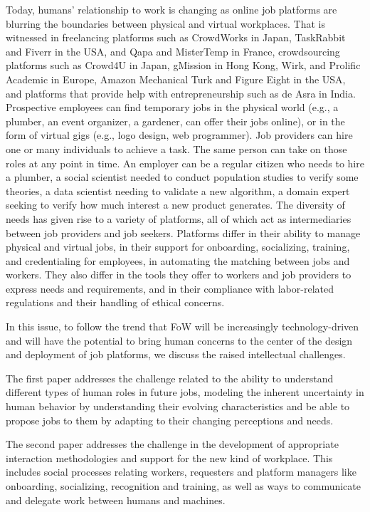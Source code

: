 \documentclass[11pt]{article}
\begin{document}
Today, humans' relationship to work is changing as online job platforms are blurring the boundaries between physical and virtual workplaces. That is witnessed in freelancing platforms such as CrowdWorks in Japan, TaskRabbit and Fiverr in the USA, and Qapa and MisterTemp in France, crowdsourcing platforms such as Crowd4U in Japan, gMission in Hong Kong, Wirk, and Prolific Academic in Europe, Amazon Mechanical Turk and Figure Eight in the USA, and platforms that provide help with entrepreneurship such as de Asra in India. Prospective employees can find temporary jobs in the physical world (e.g., a plumber, an event organizer, a gardener, can offer their jobs online), or in the form of virtual gigs (e.g., logo design, web programmer). Job providers can hire one or many individuals to achieve a task. The same person can take on those roles at any point in time. An employer can be a regular citizen who needs to hire a plumber, a social scientist needed to conduct population studies to verify some theories, a data scientist needing to validate a new algorithm, a domain expert seeking to verify how much interest a new product generates. The diversity of needs has given rise to a variety of platforms, all of which act as intermediaries between job providers and job seekers. Platforms differ in their ability to manage physical and virtual jobs, in their support for onboarding, socializing, training, and credentialing for employees, in automating the matching between jobs and workers. They also differ in the tools they offer to workers and job providers to express needs and requirements, and in their compliance with labor-related regulations and their handling of ethical concerns. 

In this issue, to follow the trend that FoW will be increasingly technology-driven and will have the potential to bring human concerns to the center of the design and deployment of job platforms,  we discuss the raised intellectual challenges.

The first paper addresses the challenge related to the ability to understand different types of human roles in future jobs, modeling the inherent uncertainty in human behavior by understanding their evolving characteristics and be able to propose jobs to them by adapting to their changing perceptions and needs.

The second paper addresses the challenge in the development of appropriate interaction methodologies and support for the new kind of workplace. This includes social processes relating workers, requesters and platform managers like onboarding, socializing, recognition and training, as well as ways to communicate and delegate work between humans and machines.
\end{document}
